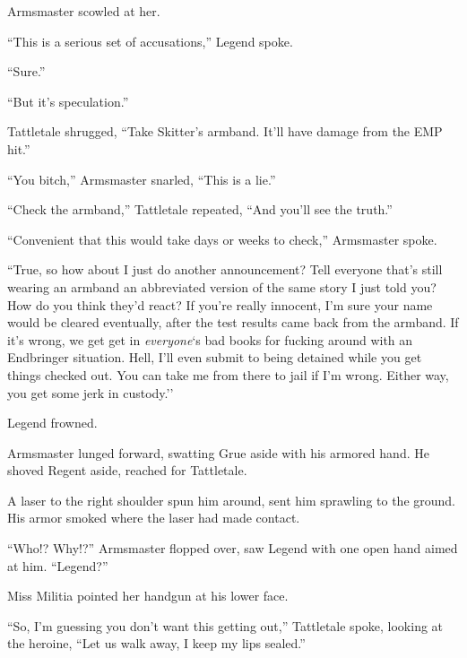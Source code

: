 Armsmaster scowled at her.



``This is a serious set of accusations,'' Legend spoke.



``Sure.''



``But it's speculation.''



Tattletale shrugged, ``Take Skitter's armband.  It'll have damage from the EMP hit.''



``You bitch,'' Armsmaster snarled, ``This is a lie.''



``Check the armband,'' Tattletale repeated, ``And you'll see the truth.''



``Convenient that this would take days or weeks to check,'' Armsmaster spoke.



``True, so how about I just do another announcement?  Tell everyone that's still wearing an armband an abbreviated version of the same story I just told you?  How do you think they'd react?  If you're really innocent, I'm sure your name would be cleared eventually, after the test results came back from the armband.  If it's wrong, we get get in \emph{everyone}`s bad books for fucking around with an Endbringer situation.  Hell, I'll even submit to being detained while you get things checked out.  You can take me from there to jail if I'm wrong.  Either way, you get some jerk in custody.''



Legend frowned.



Armsmaster lunged forward, swatting Grue aside with his armored hand.  He shoved Regent aside, reached for Tattletale.



A laser to the right shoulder spun him around, sent him sprawling to the ground.  His armor smoked where the laser had made contact.



``Who!?  Why!?''  Armsmaster flopped over, saw Legend with one open hand aimed at him.  ``Legend?''



Miss Militia pointed her handgun at his lower face.



``So, I'm guessing you don't want this getting out,'' Tattletale spoke, looking at the heroine, ``Let us walk away, I keep my lips sealed.''



